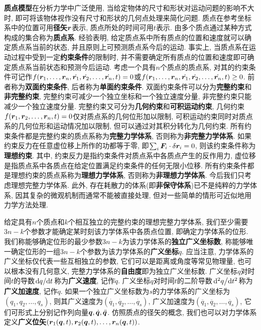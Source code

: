 \textbf{质点模型}在分析力学中广泛使用, 当给定物体的尺寸和形状对运动问题的影响不大时, 即可将该物体视作没有尺寸和形状的几何点处理来简化问题. 质点在参考坐标系中的位置可用\textbf{径矢}$ \vb*{r} $表示, 质点所处的时间可用$ t $表示. 由多个质点通过某种方式构成的集合称为\textbf{质点系}. 经验表明, 给定质点系中所有质点的位置和速度就可以确定质点系当前的状态, 并且原则上可预测质点系今后的运动. 事实上, 当质点系在运动过程中受到一定\textbf{约束条件}的限制时, 并不需要确定所有质点的位置和速度即可确定质点系当前状态和预测今后运动. 考虑一个具有$ n $个质点的质点系, 对其的约束条件可记作$ f(\vb*{r}_1,\ldots,\vb*{r}_n,\dot{\vb*{r}_1},\dot{\vb*{r}_2},\ldots,\dot{\vb*{r}_n},t)=0 $或$ f(\vb*{r}_1,\ldots,\vb*{r}_n,\dot{\vb*{r}_1},\dot{\vb*{r}_2},\ldots,\dot{\vb*{r}_n},t) \geq 0 $. 前者称为\textbf{双面约束条件}, 后者称为\textbf{单面约束条件}. 双面约束条件可以分为\textbf{完整约束}和\textbf{非完整约束}, 完整约束可减少一个独立坐标和一个独立速度分量, 非完整约束只能减少一个独立速度分量. 完整约束又可分为\textbf{几何约束}和\textbf{可积运动约束}, 几何约束$ f(\vb*{r}_1,\vb*{r}_2,\ldots,\vb*{r}_n,t)=0 $仅对质点系的几何位形加以限制, 可积运动约束同时对质点系的几何位形和运动情况加以限制, 但可以通过对其积分转化为几何约束. 所有约束条件都是完整约束的质点系称为\textbf{完整力学体系}, 否则称为\textbf{非完整力学体系}. 如果约束反力在任意虚位移上所作的功都等于零, 即$ \sum_i \vb*{F}_i \cdot \var{\vb*{r}_i} = 0 $, 则该约束条件称为\textbf{理想约束}. 其中, 约束反力是指约束条件对质点系中各质点产生的反作用力, 虚位移是指质点系中各质点在给定位置满足约束条件的任何无限小位移. 所有约束条件都是理想约束的质点系称为\textbf{理想力学体系}, 否则称为\textbf{非理想力学体系}. 今后我们只考虑理想完整力学体系. 此外, 存在耗散力的体系(即\textbf{非保守体系})已不是纯粹的力学体系, 因其复杂的微观机制而通常不能被直接处理, 但对一些简单的情形可近似地用力学方法处理.

给定具有$ n $个质点和$ k $个相互独立的完整约束的理想完整力学体系, 我们至少需要$ 3n-k $个参数才能确定某时刻该力学体系中各质点位置, 即确定力学体系的位形. 我们称能够确定位形的最少参数$ 3n-k $为该力学体系的\textbf{独立广义坐标数}, 称能够唯一确定位形的一组$ 3n-k $个参数为该力学体系的\textbf{广义坐标}$ q $. 应当注意, 力学体系的广义坐标仅代表一些互相独立的参数, 它们可以是距离或角度等常见物理量, 也可以根本没有几何意义, 完整力学体系的\textbf{自由度}即为独立广义坐标数. 广义坐标$ q $对时间$ t $的导数$ \dv*{q}{t} $称为\textbf{广义速度}, 记作$ \dot{q} $. 广义坐标$ q $对时间$ t $的二阶导数$ \dv*[2]{q}{t} $称为\textbf{广义加速度}, 记作$ \ddot{q} $. 如果一个独立广义坐标数为$ s $的力学体系的广义坐标为$ (q_1,q_2,\ldots,q_s) $, 则其广义速度为$ (\dot{q_1},\dot{q_2},\ldots,\dot{q_s}) $, 广义加速度为$ (\ddot{q_1},\ddot{q_2},\ldots,\ddot{q_s}) $, 它们可形式上分别记作列向量$ \vb*{q},\dot{\vb*{q}},\ddot{\vb*{q}} $. 仿照质点的径矢的概念, 我们也可以对力学体系定义\textbf{广义位矢}$ (\vb*{r}_1(\vb*{q},t),\vb*{r}_2(\vb*{q},t),\ldots,\vb*{r}_n(\vb*{q},t)) $.

